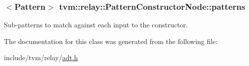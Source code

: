 \subsubsection[{\texorpdfstring{patterns}{patterns}}]{$<${\bf Pattern}$>$ tvm\+::relay\+::\+Pattern\+Constructor\+Node\+::patterns}\hypertarget{classtvm_1_1relay_1_1PatternConstructorNode_a0a09dff6a8e84eee02f6af3b2f523894}{}\label{classtvm_1_1relay_1_1PatternConstructorNode_a0a09dff6a8e84eee02f6af3b2f523894}
Sub-\/patterns to match against each input to the constructor. 

The documentation for this class was generated from the following file\+:\begin{DoxyCompactItemize}
\item 
include/tvm/relay/\hyperlink{relay_2adt_8h}{adt.\+h}\end{DoxyCompactItemize}
